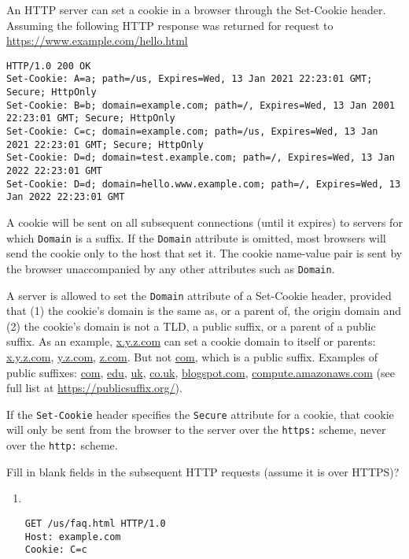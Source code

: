 \documentclass{report}
\begin{document}
\mktitle



\begin{problem}
An HTTP server can set a cookie in a browser through the Set-Cookie header.
Assuming the following HTTP response was returned for request to \url{https://www.example.com/hello.html}

\begin{lstlisting}
HTTP/1.0 200 OK
Set-Cookie: A=a; path=/us, Expires=Wed, 13 Jan 2021 22:23:01 GMT; Secure; HttpOnly
Set-Cookie: B=b; domain=example.com; path=/, Expires=Wed, 13 Jan 2001 22:23:01 GMT; Secure; HttpOnly
Set-Cookie: C=c; domain=example.com; path=/us, Expires=Wed, 13 Jan 2021 22:23:01 GMT; Secure; HttpOnly
Set-Cookie: D=d; domain=test.example.com; path=/, Expires=Wed, 13 Jan 2022 22:23:01 GMT
Set-Cookie: D=d; domain=hello.www.example.com; path=/, Expires=Wed, 13 Jan 2022 22:23:01 GMT
\end{lstlisting}

A cookie will be sent on all subsequent connections (until it expires)
to servers for which \texttt{Domain} is a suffix. If the \texttt{Domain} attribute is omitted, most browsers will send the
cookie only to the host that set it. The cookie name-value pair is sent by the browser
unaccompanied by any other attributes such as \texttt{Domain}.

A server is allowed to set the \texttt{Domain} attribute of a Set-Cookie header, provided that (1) the cookie's domain is the same as, or a parent of, the origin domain and (2) the cookie's domain is not a TLD, a public suffix, or a parent of a public suffix.
As an example, \url{x.y.z.com} can set a cookie domain to itself or parents: \url{x.y.z.com}, \url{y.z.com}, \url{z.com}. But not \url{com}, which is a public suffix.  Examples of public suffixes: \url{com}, \url{edu}, \url{uk}, \url{co.uk}, \url{blogspot.com}, \url{compute.amazonaws.com} (see full list at \url{https://publicsuffix.org/}).

If the \texttt{Set-Cookie} header specifies the \texttt{Secure} attribute for a cookie, that cookie will only be sent from the browser to the server over the \texttt{https:} scheme, never over the \texttt{http:} scheme.

Fill in blank fields in the subsequent HTTP requests (assume it is over HTTPS)?
\begin{enumerate}
\item \ {}
\begin{lstlisting}
GET /us/faq.html HTTP/1.0
Host: example.com
Cookie: C=c
\end{lstlisting}


\end{enumerate}
\end{problem}
\end{document}
